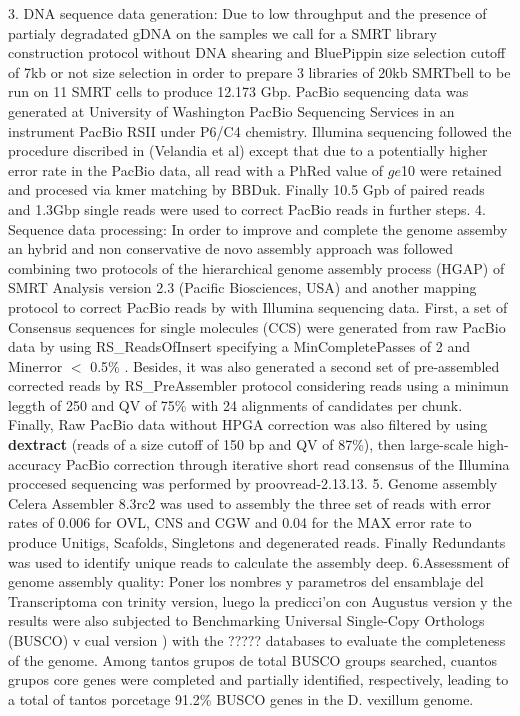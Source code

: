 3. DNA sequence data generation:
Due to low throughput and the presence of partialy degradated gDNA on the samples we call for a SMRT library construction protocol without DNA shearing and BluePippin size selection cutoff of 7kb or not size selection in order to prepare  3 libraries of 20kb SMRTbell to be run on 11 SMRT cells to produce 12.173 Gbp. PacBio sequencing data was generated at University of Washington PacBio Sequencing Services in an instrument PacBio RSII under P6/C4 chemistry.   Illumina sequencing followed the procedure discribed in (Velandia et al) except that due to a potentially higher error rate in the PacBio data, all read with a PhRed value of $ge$10 were retained and procesed via kmer matching by BBDuk. Finally 10.5 Gpb of paired reads and 1.3Gbp single reads were used to correct PacBio reads in further steps. 
4. Sequence data processing:
In order to improve and complete the genome assemby an hybrid and non conservative de novo assembly approach was followed combining two protocols of the hierarchical genome assembly process (HGAP) of SMRT Analysis version 2.3 (Pacific Biosciences, USA) and another mapping protocol to correct PacBio reads by with Illumina sequencing data. First, a set of Consensus sequences for single molecules (CCS) were generated from raw PacBio data by using RS\_ReadsOfInsert  specifying a MinCompletePasses of 2 and Minerror $<$ 0.5\% . Besides, it was also generated a second  set of pre-assembled corrected reads by RS\_PreAssembler protocol considering reads using a minimun leggth of 250 and QV of 75\% with 24 alignments of candidates per chunk. Finally, Raw PacBio data without HPGA correction was also filtered by using \textbf{dextract} (reads of a size cutoff of 150 bp and QV of 87\%), then large-scale high-accuracy PacBio correction through iterative short read consensus of the Illumina proccesed sequencing was performed by proovread-2.13.13.
5. Genome assembly
Celera Assembler 8.3rc2 was used to assembly the three set of reads with error rates of 0.006 for OVL, CNS and CGW and 0.04 for the MAX error rate to produce Unitigs, Scafolds, Singletons and degenerated reads. Finally Redundants was used to identify unique reads to calculate the assembly deep. 
6.Assessment of genome assembly quality: 
Poner los nombres y parametros del ensamblaje del Transcriptoma con trinity version, luego la predicci'on con Augustus version  y the results  were also subjected to Benchmarking Universal Single-Copy Orthologs (BUSCO) v cual version ) with the ????? databases to evaluate the completeness of the genome. Among tantos grupos de  total BUSCO groups searched, cuantos grupos core genes were completed and partially identified, respectively, leading to a total of tantos porcetage 91.2\% BUSCO genes in the D. vexillum genome. 






